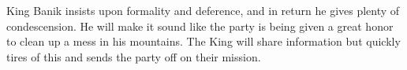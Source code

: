 King Banik insists upon formality and deference, and in return he gives plenty of condescension.
He will make it sound like the party is being given a great honor to clean up a mess in his mountains.
The King will share information but quickly tires of this and sends the party off on their mission.
